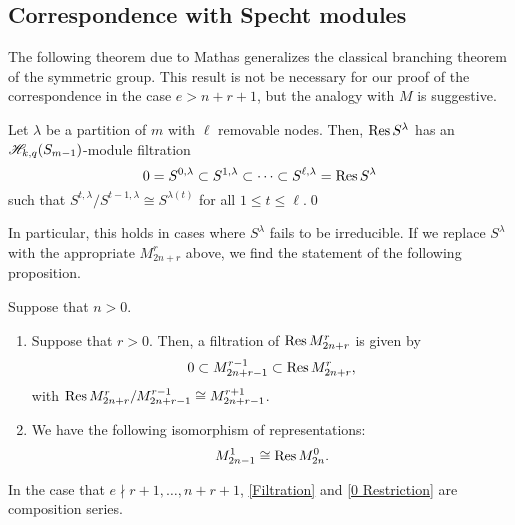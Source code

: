 \documentclass{amsart}
\begin{document}
\subsection{Correspondence with Specht modules}
The following theorem due to Mathas \cite[Thm.~5.5]{Mathas-article} generalizes the classical branching theorem of the symmetric group.
This result is not be necessary for our proof of the correspondence in the case $e > n + r + 1$, but the analogy with $M$ is suggestive.
\begin{theorem}
  Let $\lambda$ be a partition of $m$ with $\ell$ removable nodes.
  Then, $\operatorname{Res} S^\lambda$ has an $\mathscr{H}_{k,q}(S_{m-1})$-module filtration
  \[
    0 = S^{0,\lambda} \subset S^{1,\lambda} \subset \cdots \subset S^{\ell,\lambda} = \operatorname{Res} S^\lambda
  \]
  such that $S^{t,\lambda} / S^{t-1,\lambda} \cong S^{\lambda(t)}$ for all $1 \leq t \leq \ell$.\qed
\end{theorem}
In particular, this holds in cases where $S^\lambda$ fails to be irreducible.
If we replace $S^\lambda$ with the appropriate $M_{2n + r}^r$ above, we find the statement of the following proposition.
\begin{proposition}Suppose that $n > 0$.
  
  \begin{enumerate}[label={(\roman*)}]
    \item
    Suppose that $r > 0$.
    Then, a filtration of $\operatorname{Res} M_{2n + r}^r$ is given by
    \begin{equation}
      0 \subset M_{2n + r - 1}^{r-1} \subset \operatorname{Res} M_{2n + r}^r, \label{Filtration}
     \end{equation}
     with $\operatorname{Res} M_{2n + r}^r / M_{2n + r - 1}^{r-1} \cong M_{2n + r - 1}^{r + 1}$. 
    \item
      We have the following isomorphism of representations:
      \begin{equation}
        M_{2n - 1}^1 \cong \operatorname{Res} M_{2n}^0. \label{0 Restriction}
       \end{equation}
  \end{enumerate}
  In the case that $e \nmid r+1,\dots,n + r + 1$, \eqref{Filtration} and \eqref{0 Restriction} are composition series.
\end{proposition}
\end{document}
